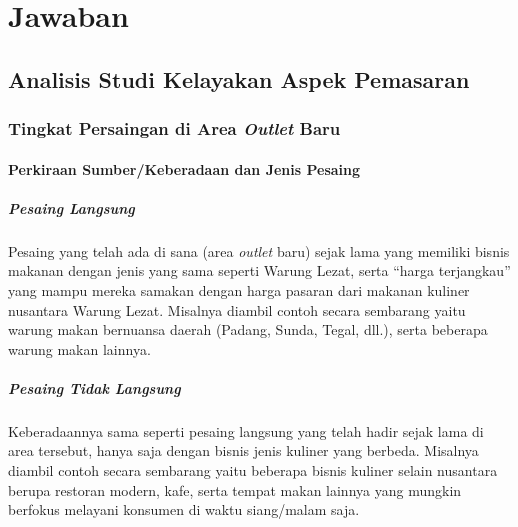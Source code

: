 \chapter{Jawaban}



\section{Analisis Studi Kelayakan Aspek Pemasaran}

\subsection{Tingkat Persaingan di Area \textit{Outlet} Baru}

\subsubsection{Perkiraan Sumber/Keberadaan dan Jenis Pesaing}

\paragraph{Pesaing Langsung} 

Pesaing yang telah ada di sana (area \textit{outlet} baru) sejak lama yang memiliki bisnis makanan dengan jenis yang sama seperti Warung Lezat, serta “harga terjangkau” yang mampu mereka samakan dengan harga pasaran dari makanan kuliner nusantara Warung Lezat. Misalnya diambil contoh secara sembarang yaitu warung makan bernuansa daerah (Padang, Sunda, Tegal, dll.), serta beberapa warung makan lainnya.

\paragraph{Pesaing Tidak Langsung}

Keberadaannya sama seperti pesaing langsung yang telah hadir sejak lama di area tersebut, hanya saja dengan bisnis jenis kuliner yang berbeda. Misalnya diambil contoh secara sembarang yaitu beberapa bisnis kuliner selain nusantara berupa restoran modern, kafe, serta tempat makan lainnya yang mungkin berfokus melayani konsumen di waktu siang/malam saja.

